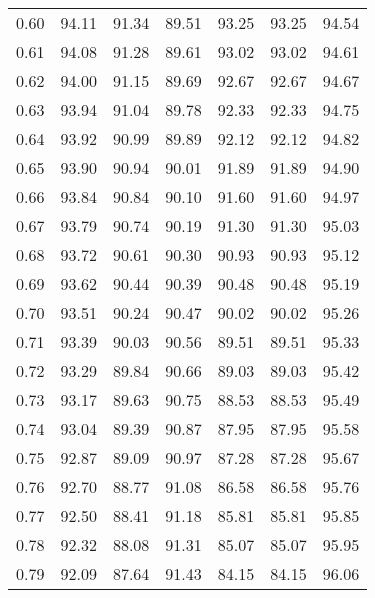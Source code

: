 \begin{tabular}{|c|c|c|c|c|c|c|}
      0.60 &     94.11 &     91.34 &      89.51 &   93.25 &      93.25 &         94.54 \\
      0.61 &     94.08 &     91.28 &      89.61 &   93.02 &      93.02 &         94.61 \\
      0.62 &     94.00 &     91.15 &      89.69 &   92.67 &      92.67 &         94.67 \\
      0.63 &     93.94 &     91.04 &      89.78 &   92.33 &      92.33 &         94.75 \\
      0.64 &     93.92 &     90.99 &      89.89 &   92.12 &      92.12 &         94.82 \\
      0.65 &     93.90 &     90.94 &      90.01 &   91.89 &      91.89 &         94.90 \\
      0.66 &     93.84 &     90.84 &      90.10 &   91.60 &      91.60 &         94.97 \\
      0.67 &     93.79 &     90.74 &      90.19 &   91.30 &      91.30 &         95.03 \\
      0.68 &     93.72 &     90.61 &      90.30 &   90.93 &      90.93 &         95.12 \\
      0.69 &     93.62 &     90.44 &      90.39 &   90.48 &      90.48 &         95.19 \\
      0.70 &     93.51 &     90.24 &      90.47 &   90.02 &      90.02 &         95.26 \\
      0.71 &     93.39 &     90.03 &      90.56 &   89.51 &      89.51 &         95.33 \\
      0.72 &     93.29 &     89.84 &      90.66 &   89.03 &      89.03 &         95.42 \\
      0.73 &     93.17 &     89.63 &      90.75 &   88.53 &      88.53 &         95.49 \\
      0.74 &     93.04 &     89.39 &      90.87 &   87.95 &      87.95 &         95.58 \\
      0.75 &     92.87 &     89.09 &      90.97 &   87.28 &      87.28 &         95.67 \\
      0.76 &     92.70 &     88.77 &      91.08 &   86.58 &      86.58 &         95.76 \\
      0.77 &     92.50 &     88.41 &      91.18 &   85.81 &      85.81 &         95.85 \\
      0.78 &     92.32 &     88.08 &      91.31 &   85.07 &      85.07 &         95.95 \\
      0.79 &     92.09 &     87.64 &      91.43 &   84.15 &      84.15 &         96.06 \\

\end{tabular}
